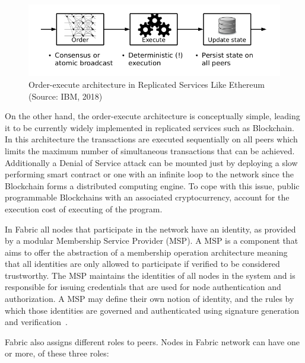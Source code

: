\begin{figure}[h]
  \centering
  \includegraphics[width=0.8\linewidth]{imgs/orderExecuteArchitecture.png}
  \caption{\label{fig:orderexecute} Order-execute architecture in Replicated
  Services Like Ethereum (Source: IBM, 2018)}
\end{figure}

On the other hand, the order-execute architecture is conceptually simple,
leading it to be currently widely implemented in replicated services such as
Blockchain. In this architecture the transactions are executed sequentially on
all peers which limits the maximum number of simultaneous transactions that can
be achieved.  Additionally a Denial of Service attack can be mounted just by
deploying a slow performing smart contract or one with an infinite loop to the
network since the Blockchain forms a distributed computing engine.  To cope
with this issue, public programmable Blockchains with an associated
cryptocurrency, account for the execution cost of executing of the program.

In Fabric all nodes that participate in the network have an identity, as
provided by a modular Membership Service Provider (MSP).  A MSP is a component
that aims to offer the abstraction of a membership operation architecture
meaning that all identities are only allowed to participate if verified to be
considered trustworthy.  The MSP maintains the identities of all nodes in the
system and is responsible for issuing credentials that are used for node
authentication and authorization. A MSP may define their own notion of
identity, and the rules by which those identities are governed and
authenticated using signature generation and
verification~\cite{HyperledgerFabricDocs2017}.

Fabric also assigns different roles to peers. Nodes in Fabric network can have
one or more, of these three roles:

